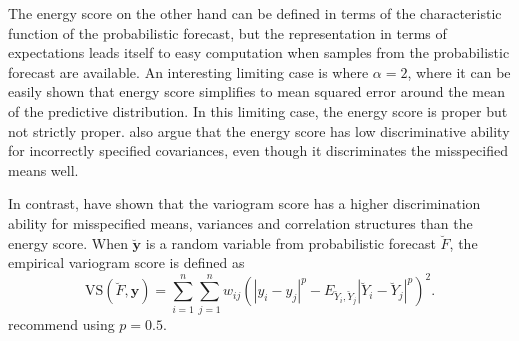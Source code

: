 \documentclass[a4paper, 11pt]{article}
\theoremstyle{definition}
\begin{document}
The energy score on the other hand can be defined in terms of the characteristic function of the probabilistic forecast, but the representation in terms of expectations leads itself to easy computation when samples from the probabilistic forecast are available. An interesting limiting case is where $\alpha=2$, where it can be easily shown that energy score simplifies to mean squared error around the mean of the predictive distribution. In this limiting case, the energy score is proper but not strictly proper. \citet{Pinson2013a} also argue that the energy score has low discriminative ability for incorrectly specified covariances, even though it discriminates the misspecified means well.

In contrast, \citet{SCHEUERER2015} have shown that the variogram score has a higher discrimination ability for misspecified means, variances and correlation structures than the energy score. When $\breve{\bm{y}}$ is a random variable from probabilistic forecast $\breve{F}$, the empirical variogram score is defined as
\begin{equation}
\text{VS}(\breve{F}, \bm{y}) = \displaystyle\sum_{i=1}^{n}\displaystyle\sum_{j=1}^{n}w_{ij}\left(|y_{i} - y_{j}|^p - E_{\breve{Y}_i,\breve{Y}_j} |\breve{Y}_{i}-\breve{Y}_{j}|^p\right)^2.
\end{equation}
\citet{SCHEUERER2015} recommend using $p=0.5$.



%
\end{document}
